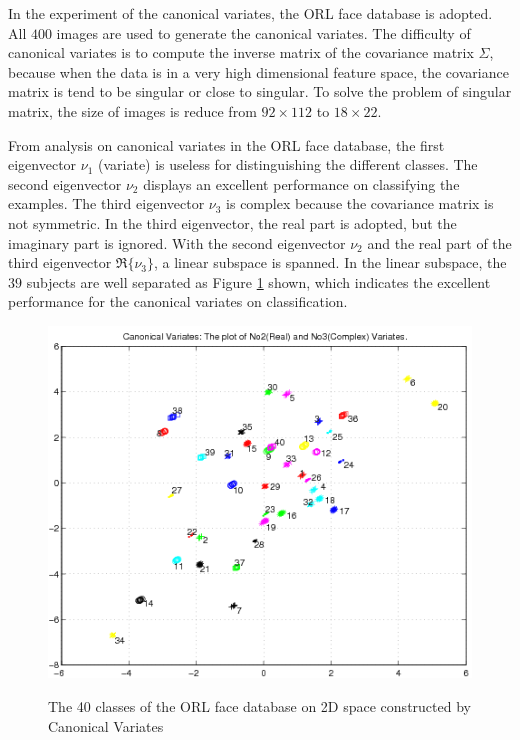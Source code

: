 In the experiment of the canonical variates, the \mbox{ORL} face database is adopted. All $400$ images are used to generate the canonical variates. The difficulty of canonical variates is to compute the inverse matrix of the covariance matrix $\Sigma$, because when the data is in a very high dimensional feature space, the covariance matrix is tend to be singular or close to singular. To solve the problem of singular matrix, the size of images is reduce from $92\times 112$ to $18\times 22$. 

From analysis on canonical variates in the \mbox{ORL} face database, the first eigenvector $\nu_1$ (variate) is useless for distinguishing the different classes. The second eigenvector $\nu_2$ displays an excellent performance on classifying the examples. The third eigenvector $\nu_3$ is complex because the covariance matrix is not symmetric. In the third eigenvector, the real part is adopted, but the imaginary part is ignored. With the second eigenvector $\nu_2$ and the real part of the third eigenvector $\Re\{\nu_3\}$, a linear subspace is spanned. In the linear subspace, the $39$ subjects are well separated as \mbox{Figure} \ref{fig:canonicalvariates} shown, which indicates the excellent performance for the canonical variates on classification.
\begin{figure}[ht]
\begin{center}
  \includegraphics[width=0.9\columnwidth]{ch3/figures/Canonical_Variate_2_3.png}
\label{fig:canonicalvariates}
\caption{The 40 classes of the \mbox{ORL} face database on 2D space constructed by Canonical Variates}
\end{center}
\end{figure} 
